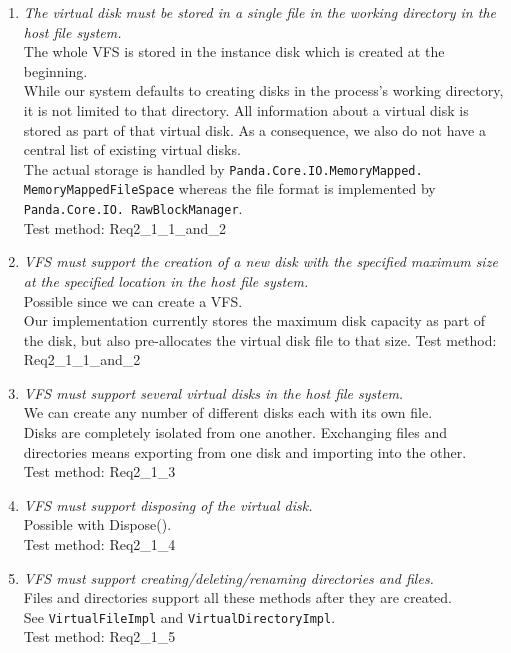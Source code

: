 \documentclass[a4paper,12pt]{article}
\begin{document}
\begin{enumerate}
	\item \emph{The virtual disk must be stored in a single file in the working directory in the host file system.}\\
		The whole VFS is stored in the instance disk which is created at the beginning.\\
		While our system defaults to creating disks in the process's working directory, it is not limited to that directory.
		 All information about a virtual disk is stored as part of that virtual disk. As a consequence, we also do not have a central list of existing virtual disks. \\
		The actual storage is handled by \texttt{Panda.Core.IO.MemoryMapped.}\\\texttt{MemoryMappedFileSpace} whereas the file format is implemented by \texttt{Panda.Core.IO. RawBlockManager}.\\
		Test method: Req2\_1\_1\_and\_2
	\item \emph{VFS must support the creation of a new disk with the specified maximum size at the specified
location in the host file system.}\\
		Possible since we can create a VFS.\\
		Our implementation currently stores the maximum disk capacity as part of the disk, but also pre-allocates the virtual disk file to that size. 
		Test method: Req2\_1\_1\_and\_2
	\item \emph{VFS must support several virtual disks in the host file system.}\\
		We can create any number of different disks each with its own file.\\
		Disks are completely isolated from one another. Exchanging files and directories means exporting from one disk and importing into the other. \\
		Test method: Req2\_1\_3
	\item \emph{VFS must support disposing of the virtual disk.}\\
		Possible with Dispose().\\
		Test method: Req2\_1\_4
	\item \emph{VFS must support creating/deleting/renaming directories and files.}\\
		Files and directories support all these methods after they are created.\\
		See \texttt{VirtualFileImpl} and \texttt{VirtualDirectoryImpl}.\\
		Test method: Req2\_1\_5

\end{enumerate}
\end{document}
